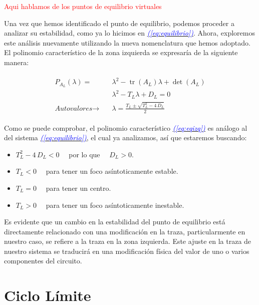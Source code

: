 \documentclass[12pt,a4paper]{report} %
\newcommand{\eref}[1]{\hyperref[#1]{\textcolor{blue}{\textit{(\ref*{#1})}}}}
\newcommand{\tr}{\operatorname{\textrm{tr}}}
\begin{document}
		\textcolor{red}{Aqui hablamos de los puntos de equilibrio virtuales}
		
		\newpage
		
		\vspace{0.5cm} Una vez que hemos identificado el punto de equilibrio, podemos proceder a analizar su estabilidad, como ya lo hicimos en \eref{eq:equilibrio}. Ahora, exploremos este análisis nuevamente utilizando la nueva nomenclatura que hemos adoptado. El polinomio característico de la zona izquierda se expresaría de la siguiente manera:
		
		\begin{eqnarray}
			\label{eq:eqizq}
			\begin{aligned}
				P_{A_L}(\lambda)=&\lambda^2-\tr(A_L)\lambda+\det(A_L) \\[1mm]
				&\lambda^2-T_L\lambda+D_L=0 \\[2mm]
				\textit{Autovalores}\rightarrow \quad &\lambda=\frac{T_L\pm \sqrt{T_L^2-4\,D_L}}{2}
			\end{aligned}
		\end{eqnarray}\smallskip

		\vspace{0.5cm}Como se puede comprobar, el polinomio característico \eref{eq:eqizq} es análogo al del sistema \eref{eq:equilibrio}, el cual ya analizamos, así que estaremos buscando:
		
		\vspace{0.2cm}\begin{itemize}
			\item $T_L^2-4\,D_L<0\quad$ por lo que $\quad D_L>0$.
			\item $T_L<0\quad$ para tener un foco asíntoticamente estable.
			\item $T_L=0\quad$ para tener un centro.
			\item $T_L>0\quad$ para tener un foco asíntoticamente inestable.
		\end{itemize}\smallskip
		
		\vspace{1cm}Es evidente que un cambio en la estabilidad del punto de equilibrio está directamente relacionado con una modificación en la traza, particularmente en nuestro caso, se refiere a la traza en la zona izquierda. Este ajuste en la traza de nuestro sistema se traducirá en una modificación física del valor de uno o varios componentes del circuito.
		
		\vspace{1cm}\section{Ciclo Límite}
		
\end{document}
